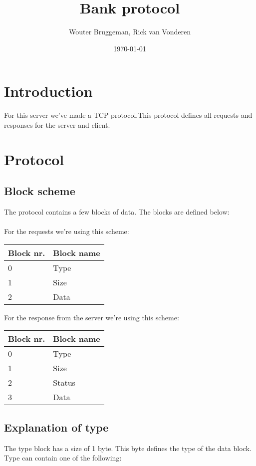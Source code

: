 \documentclass[12pt, a4paper]{article}
\title{Bank protocol}
\author{Wouter Bruggeman, Rick van Vonderen}
\date{\today}
\begin{document}
\maketitle
\newpage

\tableofcontents
\newpage

\section{Introduction}
For this server we've made a TCP protocol.This protocol defines all requests
and responses for the server and client.\\
\newpage

\section{Protocol}
\subsection{Block scheme}
The protocol contains a few blocks of data. The blocks are defined below:\\
\\
For the requests we're using this scheme:\\
\begin{tabular}{| p{2cm} | p{5cm} |}
	\hline
	\textbf{Block nr.} & \textbf{Block name} \\ \hline
	0 & Type \\ \hline
	1 & Size \\ \hline
	2 & Data \\ \hline
\end{tabular}

For the response from the server we're using this scheme:\\
\begin{tabular}{| p{2cm} | p{5cm} |}
	\hline
	\textbf{Block nr.} & \textbf{Block name} \\ \hline
	0 & Type \\ \hline
	1 & Size \\ \hline
	2 & Status \\ \hline
	3 & Data \\ \hline
\end{tabular}

\newpage

\subsection{Explanation of type}
The type block has a size of 1 byte. This byte defines the type of the data block.\\
Type can contain one of the following:\\
\end{document}
